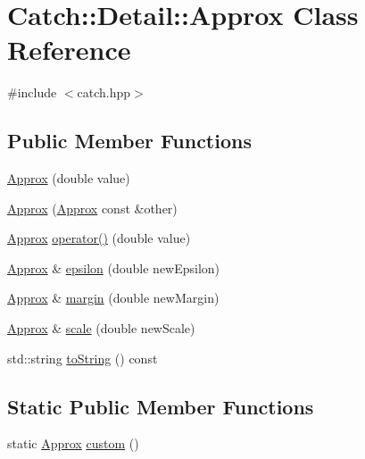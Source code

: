 \hypertarget{class_catch_1_1_detail_1_1_approx}{}\section{Catch\+:\+:Detail\+:\+:Approx Class Reference}
\label{class_catch_1_1_detail_1_1_approx}


{\ttfamily \#include $<$catch.\+hpp$>$}

\subsection*{Public Member Functions}
\begin{DoxyCompactItemize}
\item 
\mbox{\hyperlink{class_catch_1_1_detail_1_1_approx_a1a8618ea8db08c66bd3d9fe8f74b957a}{Approx}} (double value)
\item 
\mbox{\hyperlink{class_catch_1_1_detail_1_1_approx_a807330c63266fc914abdf6e461255a54}{Approx}} (\mbox{\hyperlink{class_catch_1_1_detail_1_1_approx}{Approx}} const \&other)
\item 
\mbox{\hyperlink{class_catch_1_1_detail_1_1_approx}{Approx}} \mbox{\hyperlink{class_catch_1_1_detail_1_1_approx_a48c9cbc28a05dc9dc8c3973b9eae2268}{operator()}} (double value)
\item 
\mbox{\hyperlink{class_catch_1_1_detail_1_1_approx}{Approx}} \& \mbox{\hyperlink{class_catch_1_1_detail_1_1_approx_a05c50c3ad0a971fab19345b5d94979a9}{epsilon}} (double new\+Epsilon)
\item 
\mbox{\hyperlink{class_catch_1_1_detail_1_1_approx}{Approx}} \& \mbox{\hyperlink{class_catch_1_1_detail_1_1_approx_a82f7049b41c16e6234275641fad22218}{margin}} (double new\+Margin)
\item 
\mbox{\hyperlink{class_catch_1_1_detail_1_1_approx}{Approx}} \& \mbox{\hyperlink{class_catch_1_1_detail_1_1_approx_acd80f0737bf38112beacd5ca95bef113}{scale}} (double new\+Scale)
\item 
std\+::string \mbox{\hyperlink{class_catch_1_1_detail_1_1_approx_a972fd9ac60607483263f1b0f0f9955e6}{to\+String}} () const
\end{DoxyCompactItemize}
\subsection*{Static Public Member Functions}
\begin{DoxyCompactItemize}
\item 
static \mbox{\hyperlink{class_catch_1_1_detail_1_1_approx}{Approx}} \mbox{\hyperlink{class_catch_1_1_detail_1_1_approx_aaf86dc0ee92272ac2d9839197a07951d}{custom}} ()
\end{DoxyCompactItemize}
